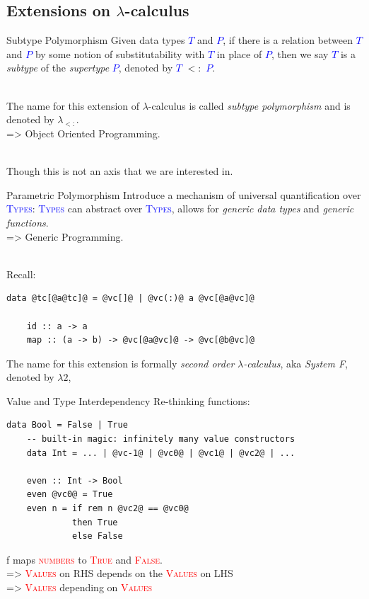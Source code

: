 \documentclass[xcolor={usenames,dvipsnames}]{beamer}
\newcommand{\htycon}[1]{\textcolor{Blue}{\textsc{#1}}}
\newcommand{\hvalcon}[1]{\textcolor{Red}{\textsc{#1}}}
\begin{document}
\subsection{Extensions on $\lambda$-calculus}

\begin{frame}[fragile]{Subtype Polymorphism}
  Given data types \htycon{$T$} and \htycon{$P$}, if there is a relation between \htycon{$T$} and \htycon{$P$} by some notion of substitutability with \htycon{$T$} in place of \htycon{$P$}, then we say \htycon{$T$} is a \textit{subtype} of the \textit{supertype} \htycon{$P$}, denoted by \htycon{$T$} $<:$ \htycon{$P$}.

  \ \\
  \pause
  The name for this extension of $\lambda$-calculus is called \textit{subtype polymorphism} and is denoted by $\lambda_{<:}$.\\
  \pause
  => Object Oriented Programming.
  
  \ \\
  \pause
  Though this is not an axis that we are interested in.
\end{frame}

\begin{frame}[fragile]{Parametric Polymorphism}
  Introduce a mechanism of universal quantification over \htycon{Types}: \htycon{Types} can abstract over \htycon{Types}, allows for \textit{generic data types} and \textit{generic functions}.\\
  \pause
  => Generic Programming.

  \ \\
  \pause
  Recall:
  \begin{lstlisting}[style=hask]
    data @tc[@a@tc]@ = @vc[]@ | @vc(:)@ a @vc[@a@vc]@

    id :: a -> a
    map :: (a -> b) -> @vc[@a@vc]@ -> @vc[@b@vc]@
  \end{lstlisting}

  \pause
  The name for this extension is formally \textit{second order} $\lambda$\textit{-calculus}, aka \textit{System F}, denoted by $\lambda2$,
\end{frame}

\begin{frame}[fragile]{Value and Type Interdependency}
  Re-thinking functions:
  \begin{lstlisting}[style=hask]
    data Bool = False | True
    -- built-in magic: infinitely many value constructors
    data Int = ... | @vc-1@ | @vc0@ | @vc1@ | @vc2@ | ... 

    even :: Int -> Bool
    even @vc0@ = True
    even n = if rem n @vc2@ == @vc0@
             then True
             else False
  \end{lstlisting}

  \qquad f maps \hvalcon{numbers} to \hvalcon{True} and \hvalcon{False}.
  \ \\
  \pause
  => \hvalcon{Values} on RHS depends on the \hvalcon{Values} on LHS
  \ \\
  \pause
  => \hvalcon{Values} depending on \hvalcon{Values}
\end{frame}
\end{document}
